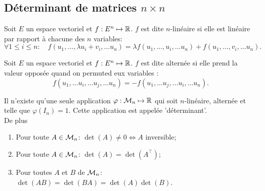 \subsection{Déterminant de matrices $n \times n$} 

\begin{definition} \label{def:applicationNLineaire}
  Soit $E$ un espace vectoriel et $f: E^n \mapsto \mathbb{R}$. $f$ est dite $n$-linéaire si elle est linéaire par rapport à chacune des $n$ variables:
  $$
  \forall 1 \leq i \leq n: \quad
  f(u_1, \dots, \lambda u_i + v_i, \dots u_n) = \lambda f(u_1, \dots, u_i, \dots u_n) + f(u_1, \dots, v_i, \dots u_n).
  $$
\end{definition}

\begin{definition} \label{def:applicationAlternee}
  Soit $E$ un espace vectoriel et $f: E^n \mapsto \mathbb{R}$. $f$ est dite alternée si elle prend la valeur opposée quand on permuted eux variables : 
  $$
  f(u_1, \dots u_i, \dots u_j, \dots u_n)
  =
  - f(u_1, \dots u_j, \dots u_i, \dots u_n).
  $$
\end{definition}

\begin{theorem} \label{thm:uniciteDeterminant}
  Il n'existe qu'une seule application $\varphi: \mathcal{M}_n \mapsto \mathbb{R}$ qui soit $n$-linéaire, alternée et telle que $\varphi(I_n) = 1$. Cette application est appelée 'déterminant'. \\
  De plus
  \begin{enumerate}[($a$)]
   \item Pour toute $A \in \mathcal{M}_n$: $\det(A) \neq 0 \Leftrightarrow A$ inversible;
   \item Pour toute $A \in \mathcal{M}_n$: $\det(A) = \det(A^\top)$;
   \item Pour toutes $A$ et $B$ de $\mathcal{M}_n$: $\det(A B) = \det(B A) = \det(A) \det(B)$.
  \end{enumerate}
\end{theorem}

